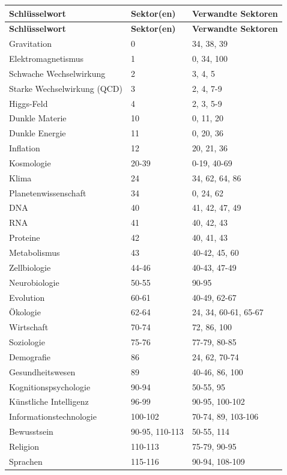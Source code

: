 \documentclass[13pt,a4paper]{article}
\begin{document}
	\begin{longtable}{|p{5cm}|p{3cm}|p{4cm}|}
		\hline
		\textbf{Schlüsselwort} & \textbf{Sektor(en)} & \textbf{Verwandte Sektoren} \\
		\hline
		\endfirsthead
		\hline
		\textbf{Schlüsselwort} & \textbf{Sektor(en)} & \textbf{Verwandte Sektoren} \\
		\hline
		\endhead
		
		Gravitation & 0 & 34, 38, 39 \\
		Elektromagnetismus & 1 & 0, 34, 100 \\
		Schwache Wechselwirkung & 2 & 3, 4, 5 \\
		Starke Wechselwirkung (QCD) & 3 & 2, 4, 7-9 \\
		Higgs-Feld & 4 & 2, 3, 5-9 \\
		Dunkle Materie & 10 & 0, 11, 20 \\
		Dunkle Energie & 11 & 0, 20, 36 \\
		Inflation & 12 & 20, 21, 36 \\
		Kosmologie & 20-39 & 0-19, 40-69 \\
		Klima & 24 & 34, 62, 64, 86 \\
		Planetenwissenschaft & 34 & 0, 24, 62 \\
		DNA & 40 & 41, 42, 47, 49 \\
		RNA & 41 & 40, 42, 43 \\
		Proteine & 42 & 40, 41, 43 \\
		Metabolismus & 43 & 40-42, 45, 60 \\
		Zellbiologie & 44-46 & 40-43, 47-49 \\
		Neurobiologie & 50-55 & 90-95 \\
		Evolution & 60-61 & 40-49, 62-67 \\
		Ökologie & 62-64 & 24, 34, 60-61, 65-67 \\
		Wirtschaft & 70-74 & 72, 86, 100 \\
		Soziologie & 75-76 & 77-79, 80-85 \\
		Demografie & 86 & 24, 62, 70-74 \\
		Gesundheitswesen & 89 & 40-46, 86, 100 \\
		Kognitionspsychologie & 90-94 & 50-55, 95 \\
		Künstliche Intelligenz & 96-99 & 90-95, 100-102 \\
		Informationstechnologie & 100-102 & 70-74, 89, 103-106 \\
		Bewusstsein & 90-95, 110-113 & 50-55, 114 \\
		Religion & 110-113 & 75-79, 90-95 \\
		Sprachen & 115-116 & 90-94, 108-109 \\
		\hline
	\end{longtable}
	
\end{document}
